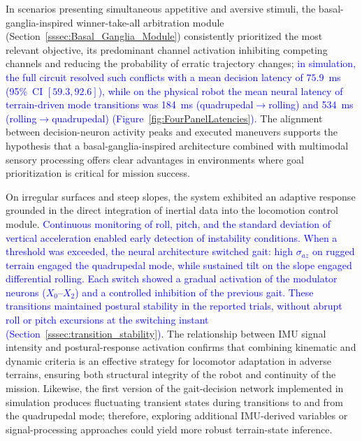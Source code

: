 \documentclass[preprint,12pt]{elsarticle}
\newcommand{\revblue}[1]{\textcolor{blue}{#1}}
\begin{document}
In scenarios presenting simultaneous appetitive and aversive stimuli, the basal-ganglia-inspired winner-take-all arbitration module (Section~\ref{sssec:Basal_Ganglia_Module}) consistently prioritized the most relevant objective, its predominant channel activation inhibiting competing channels and reducing the probability of erratic trajectory changes; \revblue{in simulation, the full circuit resolved such conflicts with a mean decision latency of $75.9$~ms (95\%~CI $[59.3, 92.6]$), while on the physical robot the mean neural latency of terrain-driven mode transitions was 184~ms (quadrupedal$\rightarrow$rolling) and 534~ms (rolling$\rightarrow$quadrupedal) (Figure~\ref{fig:FourPanelLatencies}).} The alignment between decision-neuron activity peaks and executed maneuvers supports the hypothesis that a basal-ganglia-inspired architecture combined with multimodal sensory processing offers clear advantages in environments where goal prioritization is critical for mission success. 

On irregular surfaces and steep slopes, the system exhibited an adaptive response grounded in the direct integration of inertial data into the locomotion control module. \revblue{Continuous monitoring of roll, pitch, and the standard deviation of vertical acceleration enabled early detection of instability conditions.} \revblue{When a threshold was exceeded, the neural architecture switched gait: high $\sigma_{az}$ on rugged terrain engaged the quadrupedal mode, while sustained tilt on the slope engaged differential rolling. Each switch showed a gradual activation of the modulator neurons ($X_{0}$--$X_{2}$) and a controlled inhibition of the previous gait. These transitions} \revblue{maintained postural stability in the reported trials, without abrupt roll or pitch excursions at the switching instant (Section~\ref{sssec:transition_stability})}. The relationship between IMU signal intensity and postural-response activation confirms that combining kinematic and dynamic criteria is an effective strategy for locomotor adaptation in adverse terrains, ensuring both structural integrity of the robot and continuity of the mission. Likewise, the first version of the gait-decision network implemented in simulation produces fluctuating transient states during transitions to and from the quadrupedal mode; therefore, exploring additional IMU-derived variables or signal-processing approaches could yield more robust terrain-state inference. 
\end{document}
